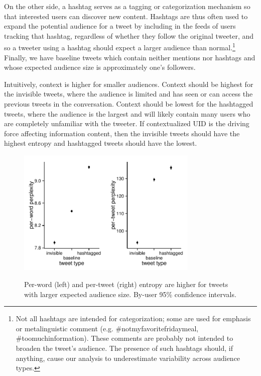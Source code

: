 \documentclass[11pt,letterpaper]{article}
\begin{document}
On the other side, a hashtag serves as a tagging or categorization mechanism so that interested users can discover new content. Hashtags are thus often used to expand the potential audience for a tweet by including in the feeds of users tracking that hashtag, regardless of whether they follow the original tweeter, and so a tweeter using a hashtag should expect a larger audience than normal.\footnote{Not all hashtags are intended for categorization; some are used for emphasis or metalinguistic comment (e.g. \#notmyfavoritefridaymeal, \#toomuchinformation). These comments are probably not intended to broaden the tweet's audience. The presence of such hashtags should, if anything, cause our analysis to underestimate variability across audience types.}  Finally, we have baseline tweets which contain neither mentions nor hashtags and whose expected audience size is approximately one's followers.

Intuitively, context is higher for smaller audiences. Context should be highest for the invisible tweets, where the audience is limited and has seen or can access the previous tweets in the conversation.  Context should be lowest for the hashtagged tweets, where the audience is the largest and will likely contain many users who are completely unfamiliar with the tweeter.  If contextualized UID is the driving force affecting information content, then the invisible tweets should have the highest entropy and hashtagged tweets should have the lowest.

\begin{figure}
 \centering \includegraphics[width=1.7in]{figures/cmcl-audience-pw.pdf}\includegraphics[width=1.7in]{figures/cmcl-audience-pt.pdf}
 \caption{\label{fig:audience} Per-word (left) and per-tweet (right) entropy are higher for tweets with larger expected audience size. By-user 95\% confidence intervals.}
\vspace*{-.5em}
\end{figure}
\end{document}
